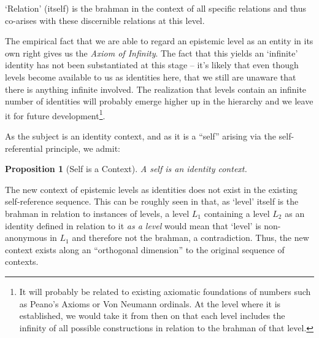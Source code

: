 \documentclass[pra,twocolumn,groupedaddress,10pt]{revtex4}
\newtheorem{proposition}[theorem]{Proposition}
\theoremstyle{definition}
\begin{document}
\begin{enumerate}[label={[\textbf{\arabic*}]},start=0]
		`Relation' (itself) is the brahman in the context of all specific relations and thus co-arises with these discernible relations at this level.

		The empirical fact that we are able to regard an epistemic level as an entity in its own right gives us the \emph{Axiom of Infinity}. The fact that this yields an `infinite' identity has not been substantiated at this stage -- it's likely that even though levels become available to us as identities here, that we still are unaware that there is anything infinite involved. The realization that levels contain an infinite number of identities will probably emerge higher up in the hierarchy and we leave it for future development\footnote{It will probably be related to existing axiomatic foundations of numbers such as Peano's Axioms or Von Neumann ordinals. At the level where it is established, we would take it from then on that each level includes the infinity of all possible constructions in relation to the brahman of that level.}.

		As the subject is an identity context, and as it is a ``self'' arising via the self-referential principle, we admit:

		\begin{proposition}[Self is a Context]
			A self is an identity context.
		\end{proposition}

		The new context of epistemic levels as identities does not exist in the existing self-reference sequence. This can be roughly seen in that, as `level' itself is the brahman in relation to instances of levels, a level $L_{1}$ containing a level $L_{2}$ as an identity defined in relation to it \emph{as a level} would mean that `level' is non-anonymous in $L_{1}$ and therefore not the brahman, a contradiction. Thus, the new context exists along an ``orthogonal dimension'' to the original sequence of contexts.


\end{enumerate}
\end{document}
